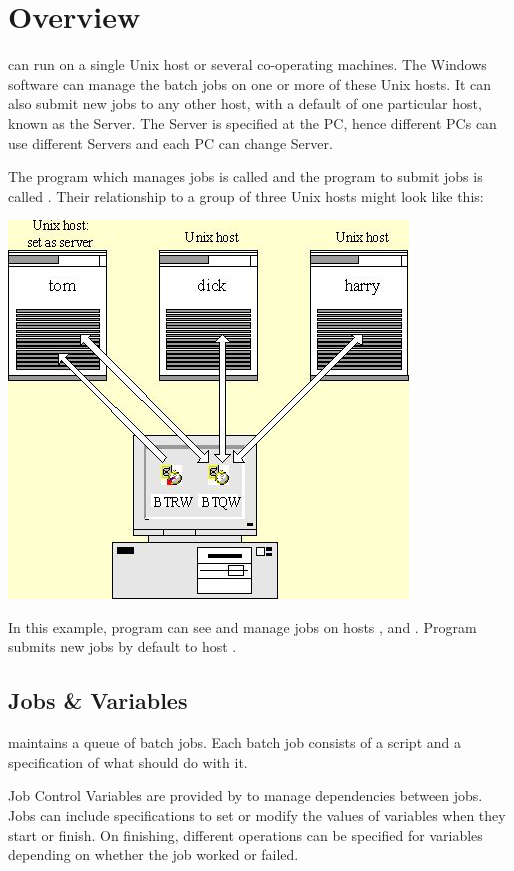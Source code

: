 \chapter{Overview}
\label{chp:overview}
\ProductName{} can run on a single Unix host or several co-operating machines.
The Windows software can manage the batch jobs on one or more of these
Unix hosts. It can also submit new jobs to any other host, with a default of one particular host, known as the
Server. The Server is specified at the PC, hence different PCs can use
different Servers and each PC can change Server.

The program which manages jobs is called  and
the program to submit jobs is called . Their
relationship to a group of three Unix hosts might look like this:

\includegraphics{img/win1.jpg} 

In this example, program  can see and manage
jobs on hosts , 
and . Program 
submits new jobs by default to host .

\section{Jobs \& Variables}
\ProductName{} maintains a queue of batch jobs. Each batch job consists of a
script and a specification of what \ProductName{} should do with it.

Job Control Variables are provided by \ProductName{} to manage dependencies
between jobs. Jobs can include specifications to set or modify the
values of variables when they start or finish. On finishing, different
operations can be specified for variables depending on whether the job
worked or failed.

